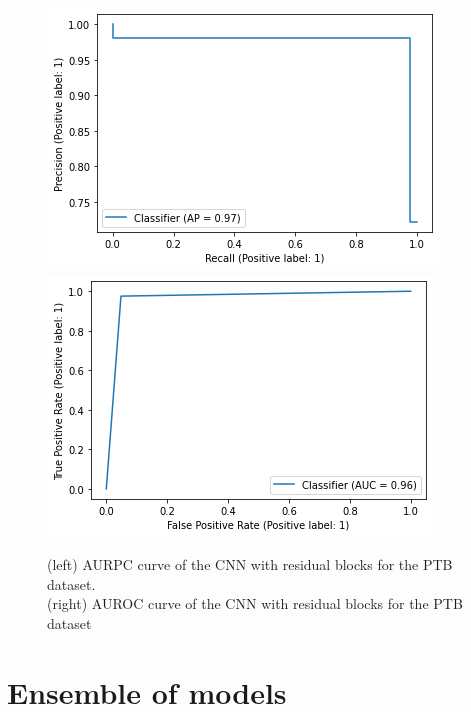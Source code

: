 \documentclass[11pt]{scrartcl}
\begin{document}
\begin{figure}[htp]
\centering
\includegraphics[width=.50\textwidth]{../models_performance_graphs/ptb/transformer_ptb_auprc.png}\hfill
\includegraphics[width=.50\textwidth]{../models_performance_graphs/ptb/transformer_ptb_auroc.png}\hfill
\caption{(left) AURPC curve of the CNN with residual blocks for the PTB dataset. \\ (right) AUROC curve of the CNN with residual blocks for the PTB dataset}
\label{fig:transformer_ptb_two}
\end{figure}











































\section{Ensemble of models}
\end{document}
